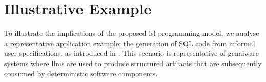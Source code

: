 \documentclass[manuscript,screen]{acmart}
\begin{document}
\section{Illustrative Example}
\label{sec:illustrative-example}

To illustrate the implications of the proposed \ac{lsl} programming model, we analyse a representative application example: the generation of SQL code from informal user specifications, as introduced in . 
This scenario is representative of \ac{genai}ware systems where \acp{llm} are used to produce structured artifacts that are subsequently consumed by deterministic software components.
\end{document}
